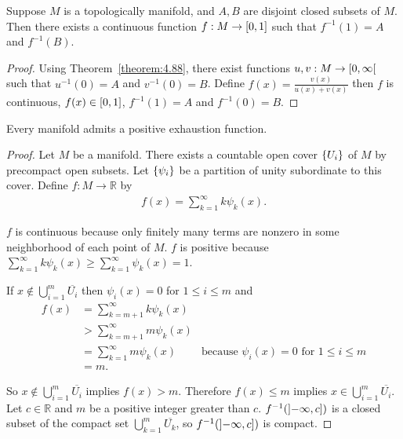 \begin{corollary}{4.89}
	Suppose $M$ is a topologically manifold, and $A, B$ are disjoint closed subsets of $M$. Then there exists a continuous function $f: M\to \left[{0,1}\right]$ such that $f^{-1}(1) = A$ and $f^{-1}(B)$.
\end{corollary}

\begin{proof}
	Using Theorem~\ref{theorem:4.88}, there exist functions $u, v: M \to \left[{0, \infty}\right[$ such that $u^{-1}(0) = A$ and $v^{-1}(0) = B$. Define $f(x) = \frac{v(x)}{u(x) + v(x)}$ then $f$ is continuous, $f(x) \in \left[{0, 1}\right]$, $f^{-1}(1) = A$ and $f^{-1}(0) = B$.
\end{proof}

\begin{theorem}{4.90}\label{theorem:4.90}
	Every manifold admits a positive exhaustion function.
\end{theorem}

\begin{proof}
	Let $M$ be a manifold. There exists a countable open cover $\left\{{U_{i}}\right\}$ of $M$ by precompact open subsets. Let $\left\{{\psi_{i}}\right\}$ be a partition of unity subordinate to this cover. Define $f: M\to \mathbb{R}$ by
	\begin{align*}
		f(x) = \sum^{\infty}_{k=1}k\psi_{k}(x).
	\end{align*}

	$f$ is continuous because only finitely many terms are nonzero in some neighborhood of each point of $M$. $f$ is positive because $\sum^{\infty}_{k=1}k\psi_{k}(x) \geq \sum^{\infty}_{k=1}\psi_{k}(x) = 1$.

	If $x\notin \bigcup^{m}_{i=1}\overline{U_{i}}$ then $\psi_{i}(x) = 0$ for $1\leq i\leq m$ and
	\begin{align*}
		f(x) & = \sum^{\infty}_{k=m+1}k\psi_{k}(x)                                                        \\
		     & > \sum^{\infty}_{k=m+1}m\psi_{k}(x)                                                        \\
		     & = \sum^{\infty}_{k=1}m\psi_{k}(x)   & \text{because $\psi_{i}(x) = 0$ for $1\leq i\leq m$} \\
		     & = m.
	\end{align*}

	So $x\notin \bigcup^{m}_{i=1}\overline{U_{i}}$ implies $f(x) > m$. Therefore $f(x) \leq m$ implies $x \in \bigcup^{m}_{i=1}\overline{U_{i}}$. Let $c\in \mathbb{R}$ and $m$ be a positive integer greater than $c$. $f^{-1}(\left]{-\infty, c}\right])$ is a closed subset of the compact set $\bigcup_{k=1}^{m}\overline{U_{k}}$, so $f^{-1}(\left]{-\infty, c}\right])$ is compact.
\end{proof}

